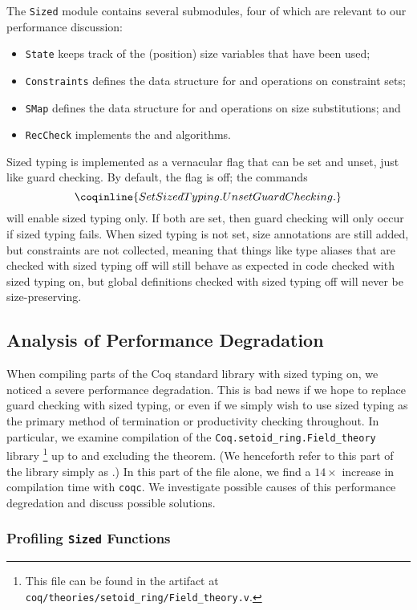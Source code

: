 The \texttt{Sized} module contains several submodules, four of which are relevant to our performance discussion:
\begin{itemize}
  \item \texttt{State} keeps track of the (position) size variables that have been used;
  \item \texttt{Constraints} defines the data structure for and operations on constraint sets;
  \item \texttt{SMap} defines the data structure for and operations on size substitutions; and
  \item \texttt{RecCheck} implements the \RecCheck and \solve algorithms.
\end{itemize}

Sized typing is implemented as a vernacular flag that can be set and unset, just like guard checking.
By default, the flag is off; the commands
$$\coqinline{Set Sized Typing. Unset Guard Checking.}$$
will enable sized typing only.
If both are set, then guard checking will only occur if sized typing fails.
When sized typing is not set, size annotations are still added, but constraints are not collected,
meaning that things like type aliases that are checked with sized typing off will still behave as expected in code checked with sized typing on,
but global definitions checked with sized typing off will never be size-preserving.

\subsection{Analysis of Performance Degradation}

When compiling parts of the Coq standard library with sized typing on, we noticed a severe performance degradation.
This is bad news if we hope to replace guard checking with sized typing,
or even if we simply wish to use sized typing as the primary method of termination or productivity checking throughout.
In particular, we examine compilation of the \texttt{Coq.setoid\_ring.Field\_theory} library%
\footnote{This file can be found in the artifact at \texttt{coq/theories/setoid\_ring/Field\_theory.v}.}
up to and excluding the \fnormeval theorem.
(We henceforth refer to this part of the library simply as \fieldtheory.)
In this part of the file alone, we find a $14\times$ increase in compilation time with \texttt{coqc}.
We investigate possible causes of this performance degredation and discuss possible solutions.

\subsubsection{Profiling \texttt{Sized} Functions}

